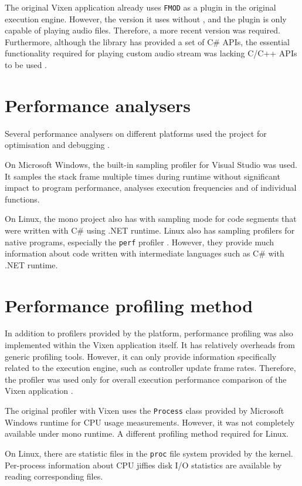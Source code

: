 The original Vixen application already uses \texttt{FMOD} as a plugin in the original execution engine. However, the version it uses   without , and the plugin is only capable of playing audio files. Therefore, a more recent version was required. Furthermore, although the library has provided a set of C\# APIs,  the essential functionality required for playing custom audio stream was lacking\cc{;} C/C++ APIs  to be used .

\section{Performance analysers}

Several performance analysers on different platforms  used  the project for optimisation and debugging .

On Microsoft Windows, the built-in sampling profiler for Visual Studio was used. It samples the stack frame multiple times during runtime without significant impact to program performance, analyses execution frequencies and   of individual functions.

On Linux, the mono project also has  with sampling mode for  code segments that were written with C\# using  .NET runtime. Linux also has sampling profilers for native programs, especially the \texttt{perf} profiler \cite{de2010new}. However, they  provide much information about code written with intermediate languages such as C\# with  .NET runtime. 

\section{Performance profiling method}

In addition to profilers provided by the platform, performance profiling was also implemented within the Vixen application itself. It has relatively  overheads from generic profiling tools. However, it can only provide information specifically related to the execution engine, such as controller update frame rates. Therefore, the profiler was used only for overall execution performance comparison of the Vixen application .

The original profiler with Vixen uses the \texttt{Process} class provided by Microsoft Windows runtime for CPU usage measurements. However, it was not completely available under  mono runtime. A different profiling method  required for Linux.

On Linux, there are statistic files in the \texttt{proc} file system \cite{proc} provided by the kernel. Per-process information about CPU jiffies  disk I/O statistics are available by reading  corresponding files.
